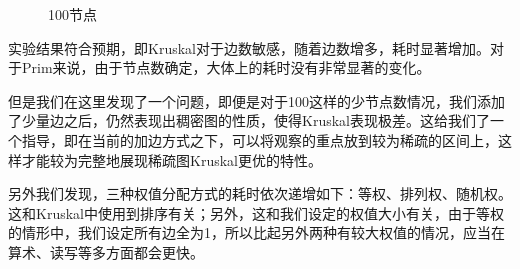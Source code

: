 \documentclass[UTF8]{ctexart}
\begin{document}
\begin{figure}[htbp]
    \caption{100节点}
    \label{fig:100a}
\end{figure}

实验结果符合预期，即Kruskal对于边数敏感，随着边数增多，耗时显著增加。对于Prim来说，由于节点数确定，大体上的耗时没有非常显著的变化。

但是我们在这里发现了一个问题，即便是对于100这样的少节点数情况，我们添加了少量边之后，仍然表现出稠密图的性质，使得Kruskal表现极差。这给我们了一个指导，即在当前的加边方式之下，可以将观察的重点放到较为稀疏的区间上，这样才能较为完整地展现稀疏图Kruskal更优的特性。

另外我们发现，三种权值分配方式的耗时依次递增如下：等权、排列权、随机权。这和Kruskal中使用到排序有关；另外，这和我们设定的权值大小有关，由于等权的情形中，我们设定所有边全为1，所以比起另外两种有较大权值的情况，应当在算术、读写等多方面都会更快。
\end{document}
